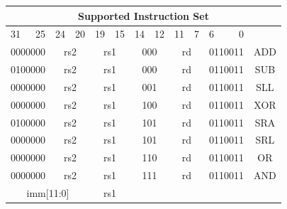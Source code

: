 \documentclass[10pt,letterpaper]{article}
\begin{document}
\begin{table}[H]
	\centering
	\begin{tabular}{|crcrcrcrcrcrc|}
		\hline
		\multicolumn{13}{|c|}{Supported Instruction Set} \\ \hline
		\multicolumn{1}{|l}{31} &
		\multicolumn{1}{r|}{25} &
		\multicolumn{1}{l}{24} &
		\multicolumn{1}{r|}{20} &
		\multicolumn{1}{l}{19} &
		\multicolumn{1}{r|}{15} &
		\multicolumn{1}{l}{14} &
		\multicolumn{1}{r|}{12} &
		\multicolumn{1}{l}{11} &
		\multicolumn{1}{r|}{7} &
		\multicolumn{1}{l}{6} &
		\multicolumn{1}{r|}{0} &
		\multicolumn{1}{l|}{} \\ \hline
		\multicolumn{2}{|c|}{0000000} &
		\multicolumn{2}{c|}{rs2} &
		\multicolumn{2}{c|}{rs1} &
		\multicolumn{2}{c|}{000} &
		\multicolumn{2}{c|}{rd} &
		\multicolumn{2}{c|}{0110011} &
		ADD \\ \hline
		\multicolumn{2}{|c|}{0100000} &
		\multicolumn{2}{c|}{rs2} &
		\multicolumn{2}{c|}{rs1} &
		\multicolumn{2}{c|}{000} &
		\multicolumn{2}{c|}{rd} &
		\multicolumn{2}{c|}{0110011} &
		SUB \\ \hline
		\multicolumn{2}{|c|}{0000000} &
		\multicolumn{2}{c|}{rs2} &
		\multicolumn{2}{c|}{rs1} &
		\multicolumn{2}{c|}{001} &
		\multicolumn{2}{c|}{rd} &
		\multicolumn{2}{c|}{0110011} &
		SLL \\ \hline
		\multicolumn{2}{|c|}{0000000} &
		\multicolumn{2}{c|}{rs2} &
		\multicolumn{2}{c|}{rs1} &
		\multicolumn{2}{c|}{100} &
		\multicolumn{2}{c|}{rd} &
		\multicolumn{2}{c|}{0110011} &
		XOR \\ \hline
		\multicolumn{2}{|c|}{0100000} &
		\multicolumn{2}{c|}{rs2} &
		\multicolumn{2}{c|}{rs1} &
		\multicolumn{2}{c|}{101} &
		\multicolumn{2}{c|}{rd} &
		\multicolumn{2}{c|}{0110011} &
		SRA \\ \hline
		\multicolumn{2}{|c|}{0000000} &
		\multicolumn{2}{c|}{rs2} &
		\multicolumn{2}{c|}{rs1} &
		\multicolumn{2}{c|}{101} &
		\multicolumn{2}{c|}{rd} &
		\multicolumn{2}{c|}{0110011} &
		SRL \\ \hline
		\multicolumn{2}{|c|}{0000000} &
		\multicolumn{2}{c|}{rs2} &
		\multicolumn{2}{c|}{rs1} &
		\multicolumn{2}{c|}{110} &
		\multicolumn{2}{c|}{rd} &
		\multicolumn{2}{c|}{0110011} &
		OR \\ \hline
		\multicolumn{2}{|c|}{0000000} &
		\multicolumn{2}{c|}{rs2} &
		\multicolumn{2}{c|}{rs1} &
		\multicolumn{2}{c|}{111} &
		\multicolumn{2}{c|}{rd} &
		\multicolumn{2}{c|}{0110011} &
		AND \\ \hline
		\multicolumn{4}{|c|}{imm{[}11:0{]}} &
		\multicolumn{2}{c|}{rs1} &

\end{tabular}
\end{table}
\end{document}
